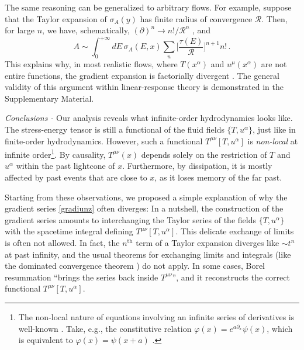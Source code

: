 \documentclass[a4paper, amsfonts, amssymb, amsmath, reprint, showkeys, twoside,notitlepage]{revtex4-2}
\begin{document}
The same reasoning can be generalized to arbitrary flows. For example, suppose that the Taylor expansion of $\sigma_A(y)$ has finite radius of convergence $\mathcal{R}$. Then, for large $n$, we have, schematically, $(\partial)^n \rightarrow n!/\mathcal{R}^n$ \cite{AnalyticFunctions_book}, and 
\begin{equation}\label{twntyfourrr3}
    A \sim \int_0^{+\infty} \! \! \! dE \, \sigma_A(E,x) \sum_n \bigg[\dfrac{\tau(E)}{\mathcal{R}} \bigg]^{n+1} n! \, .
\end{equation}
This explains why, in most realistic flows, where $T(x^\alpha)$ and $u^\mu(x^\alpha)$ are not entire functions, the gradient expansion is factorially divergent \cite{HellerBeyondBjorken2022}. The general validity of this argument within linear-response theory is demonstrated in the Supplementary Material.






\textit{Conclusions -} Our analysis reveals what infinite-order hydrodynamics looks like. The stress-energy tensor is still a functional of the fluid fields $\{T,u^\alpha\}$, just like in finite-order hydrodynamics. However, such a functional $T^{\mu \nu}[T,u^\alpha]$ is \textit{non-local} at infinite order\footnote{The non-local nature of equations involving an infinite series of derivatives is well-known \cite{GavassinoDispersion2024}. Take, e.g., the constitutive relation $\varphi(x)=e^{a\partial_x}\psi(x)$, which is equivalent to $\varphi(x)=\psi(x+a)$ \cite{Callen_book}.}. By causality, $T^{\mu \nu}(x)$ depends solely on the restriction of $T$ and $u^\alpha$ within the past lightcone of $x$. Furthermore, by dissipation, it is mostly affected by past events that are close to $x$, as it loses memory of the far past. 

Starting from these observations, we proposed a simple explanation of why the gradient series \eqref{gradiunz} often diverges:
In a nutshell, the construction of the gradient series amounts to interchanging the Taylor series of the fields $\{T,u^\alpha\}$ with the spacetime integral defining $T^{\mu \nu}[T,u^\alpha]$. This delicate exchange of limits is often not allowed. In fact, the $n^\text{th}$ term of a Taylor expansion diverges like $\sim t^n$ at past infinity, and the usual theorems for exchanging limits and integrals (like the dominated convergence theorem \cite{Rudin_book}) do not apply. In some cases, Borel resummation ``brings the series back inside $T^{\mu \nu}$'', and it reconstructs the correct functional $T^{\mu \nu}[T,u^\alpha]$. 
\end{document}
